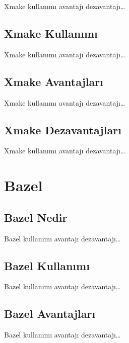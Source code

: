 \documentclass[
]{book}
\begin{document}
Xmake kullanımı avantajı dezavantajı\ldots{}

\hypertarget{xmake-kullanux131mux131}{%
\section{Xmake Kullanımı}\label{xmake-kullanux131mux131}}

Xmake kullanımı avantajı dezavantajı\ldots{}

\hypertarget{xmake-avantajlarux131}{%
\section{Xmake Avantajları}\label{xmake-avantajlarux131}}

Xmake kullanımı avantajı dezavantajı\ldots{}

\hypertarget{xmake-dezavantajlarux131}{%
\section{Xmake Dezavantajları}\label{xmake-dezavantajlarux131}}

Xmake kullanımı avantajı dezavantajı\ldots{}

\hypertarget{bazel}{%
\chapter{Bazel}\label{bazel}}

\hypertarget{bazel-nedir}{%
\section{Bazel Nedir}\label{bazel-nedir}}

Bazel kullanımı avantajı dezavantajı\ldots{}

\hypertarget{bazel-kullanux131mux131}{%
\section{Bazel Kullanımı}\label{bazel-kullanux131mux131}}

Bazel kullanımı avantajı dezavantajı\ldots{}

\hypertarget{bazel-avantajlarux131}{%
\section{Bazel Avantajları}\label{bazel-avantajlarux131}}

Bazel kullanımı avantajı dezavantajı\ldots{}
\end{document}
